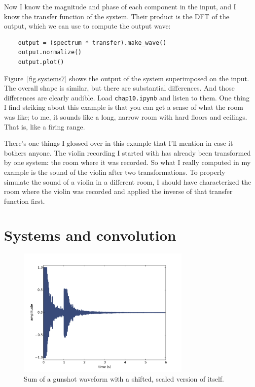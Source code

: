 \documentclass[12pt]{book}
\begin{document}
Now I know the magnitude and phase of each component in the
input, and I know the transfer function of the system.  Their
product is the DFT of the output, which we can use to compute the
output wave:

\begin{verbatim}
    output = (spectrum * transfer).make_wave()
    output.normalize()
    output.plot()
\end{verbatim}

Figure~\ref{fig.systems7} shows the output of the system superimposed
on the input.  The overall shape is similar, but there are substantial
differences.  And those differences are clearly audible.  Load
{\tt chap10.ipynb} and listen to them.  One thing I find striking
about this example is that you can get a sense of what the room
was like; to me, it sounds like a long, narrow room with hard floors
and ceilings.  That is, like a firing range.

There's one things I glossed over in this example that I'll mention
in case it bothers anyone.  The violin recording I started with
has already been transformed by one system: the room where it was
recorded.  So what I really computed in my example is the sound
of the violin after two transformations.  To properly simulate
the sound of a violin in a different room, I should have characterized
the room where the violin was recorded and applied the inverse
of that transfer function first.


\section{Systems and convolution}

\begin{figure}
\centerline{\includegraphics[height=2.5in]{figs/systems8.pdf}}
\caption{Sum of a gunshot waveform with a shifted, scaled version of
itself.}
\label{fig.systems8}
\end{figure}
\end{document}
